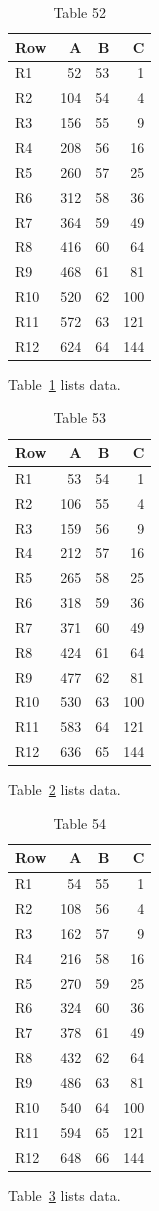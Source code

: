 \documentclass[10pt]{article}
\begin{document}
\begin{table}[ht]\centering\caption{Table 52}\label{tab:52}\begin{tabular}{lrrr}\toprule Row&A&B&C\\\midrule
R1&52&53&1\\
R2&104&54&4\\
R3&156&55&9\\
R4&208&56&16\\
R5&260&57&25\\
R6&312&58&36\\
R7&364&59&49\\
R8&416&60&64\\
R9&468&61&81\\
R10&520&62&100\\
R11&572&63&121\\
R12&624&64&144\\
\bottomrule\end{tabular}\end{table} Table~\ref{tab:52} lists data.
\begin{table}[ht]\centering\caption{Table 53}\label{tab:53}\begin{tabular}{lrrr}\toprule Row&A&B&C\\\midrule
R1&53&54&1\\
R2&106&55&4\\
R3&159&56&9\\
R4&212&57&16\\
R5&265&58&25\\
R6&318&59&36\\
R7&371&60&49\\
R8&424&61&64\\
R9&477&62&81\\
R10&530&63&100\\
R11&583&64&121\\
R12&636&65&144\\
\bottomrule\end{tabular}\end{table} Table~\ref{tab:53} lists data.
\begin{table}[ht]\centering\caption{Table 54}\label{tab:54}\begin{tabular}{lrrr}\toprule Row&A&B&C\\\midrule
R1&54&55&1\\
R2&108&56&4\\
R3&162&57&9\\
R4&216&58&16\\
R5&270&59&25\\
R6&324&60&36\\
R7&378&61&49\\
R8&432&62&64\\
R9&486&63&81\\
R10&540&64&100\\
R11&594&65&121\\
R12&648&66&144\\
\bottomrule\end{tabular}\end{table}\clearpage Table~\ref{tab:54} lists data.
\end{document}
